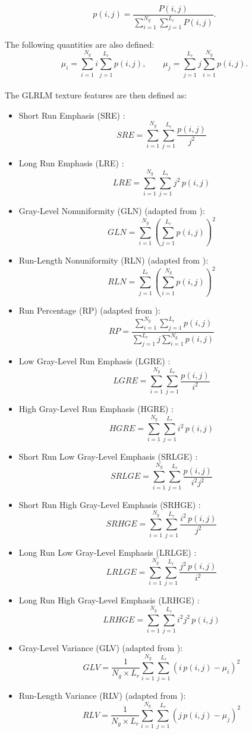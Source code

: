 \documentclass{article}
\begin{document}
\[p(i,j) = \frac{P(i,j)}{\sum_{i=1}^{N_g}\sum_{j=1}^{L_r} P(i,j)}.\]

\noindent The following quantities are also defined:
\[\mu_i = \sum_{i=1}^{N_g} i \sum_{j=1}^{L_r} p(i,j), \qquad \mu_j = \sum_{j=1}^{L_r} j \sum_{i=1}^{N_g} p(i,j).\] \\

\noindent The GLRLM texture features are then defined as:

\begin{itemize}
	\item Short Run Emphasis (SRE) \cite{GallowayMM1975}:
		  \[SRE = \sum_{i=1}^{N_g}\sum_{j=1}^{L_r} \frac{p(i,j)}{j^2}\]
	\item Long Run Emphasis (LRE) \cite{GallowayMM1975}:
		  \[LRE = \sum_{i=1}^{N_g}\sum_{j=1}^{L_r} j^2\,p(i,j)\]
	\item Gray-Level Nonuniformity (GLN) (adapted from \cite{GallowayMM1975}):
		  \[GLN = \sum_{i=1}^{N_g}\left(\sum_{j=1}^{L_r} p(i,j)\right)^2\]
	\item Run-Length Nonuniformity (RLN) (adapted from \cite{GallowayMM1975}):
		  \[RLN = \sum_{j=1}^{L_r}\left(\sum_{i=1}^{N_g} p(i,j)\right)^2\]
	\item Run Percentage (RP) (adapted from \cite{GallowayMM1975}):
		  \[RP = \frac{\sum_{i=1}^{N_g}\sum_{j=1}^{L_r} p(i,j)}{\sum_{j=1}^{L_r} j 
		  \sum_{i=1}^{N_g} p(i,j)}\]
	\item Low Gray-Level Run Emphasis (LGRE) \cite{ChuA1990}:
		  \[LGRE = \sum_{i=1}^{N_g}\sum_{j=1}^{L_r} \frac{p(i,j)}{i^2}\]
	\item High Gray-Level Run Emphasis (HGRE) \cite{ChuA1990}:
		  \[HGRE = \sum_{i=1}^{N_g}\sum_{j=1}^{L_r} i^2\,p(i,j)\]
	\item Short Run Low Gray-Level Emphasis (SRLGE) \cite{DasarathyBV1991}:
		  \[SRLGE = \sum_{i=1}^{N_g}\sum_{j=1}^{L_r} \frac{p(i,j)}{i^2j^2}\]
	\item Short Run High Gray-Level Emphasis (SRHGE) \cite{DasarathyBV1991}:
		  \[SRHGE = \sum_{i=1}^{N_g}\sum_{j=1}^{L_r} \frac{i^2\,p(i,j)}{j^2}\]
	\item Long Run Low Gray-Level Emphasis (LRLGE) \cite{DasarathyBV1991}:
		  \[LRLGE = \sum_{i=1}^{N_g}\sum_{j=1}^{L_r} \frac{j^2\,p(i,j)}{i^2}\]
	\item Long Run High Gray-Level Emphasis (LRHGE) \cite{DasarathyBV1991}:
		  \[LRHGE = \sum_{i=1}^{N_g}\sum_{j=1}^{L_r} i^2j^2\,p(i,j)\]
	\item Gray-Level Variance (GLV) (adapted from \cite{ThibaultG2009}):
		  \[GLV = \frac{1}{N_g \times L_r} \sum_{i=1}^{N_g}\sum_{j=1}^{L_r} 
		  \left(i\,p(i,j)-\mu_i\right)^2\]
	\item Run-Length Variance (RLV) (adapted from \cite{ThibaultG2009}):
		  \[RLV = \frac{1}{N_g \times L_r} \sum_{i=1}^{N_g}\sum_{j=1}^{L_r} 
		  \left(j\,p(i,j)-\mu_j\right)^2\]
	\\
\end{itemize}
\end{document}

